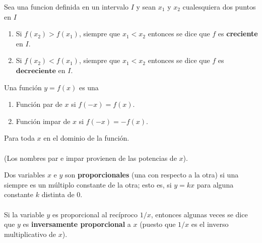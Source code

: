    \begin{tcolorbox}[colframe=white]
	\begin{def.}
	    Sea una funcion definida en un intervalo $I$ y sean $x_1$ y $x_2$ cualesquiera dos puntos en $I$ 
	    \begin{enumerate}[\bfseries 1.]
		\item Si $f(x_2) > f(x_1)$, siempre que $x_1<x_2$ entonces se dice que $f$ es \textbf{creciente} en $I$.
		\item Si $f(x_2) < f(x_1)$, siempre que $x_1<x_2$ entonces se dice que $f$ es $\textbf{decreciente}$ en $I$.\\
	    \end{enumerate}
	\end{def.}
    \end{tcolorbox}

    \begin{tcolorbox}[colframe=white]
	\begin{def.}
	Una función $y=f(x)$ es una 
	    \begin{enumerate}[\bfseries 1.]
		\item Función par de $x$ si $f(-x)=f(x)$.
		\item Función impar de $x$ si $f(-x)=-f(x)$.
	    \end{enumerate}
	Para toda $x$ en el dominio de la función.\\\\
	(Los nombres par e impar provienen de las potencias de $x$).\\
	\end{def.}
    \end{tcolorbox}

    \begin{tcolorbox}[colframe=white]
	\begin{def.}
	    Dos variables $x$ e $y$ son \textbf{proporcionales} (una con respecto a la otra) si una siempre es un múltiplo constante de la otra; esto es, si $y=kx$ para alguna constante $k$ distinta de $0$.\\\\
	    Si la variable $y$ es proporcional al recíproco $1/x$, entonces algunas veces se dice que $y$ es \textbf{inversamente proporcional} a $x$ (puesto que $1/x$ es el inverso multiplicativo de $x$).\\

	\end{def.}
    \end{tcolorbox}


